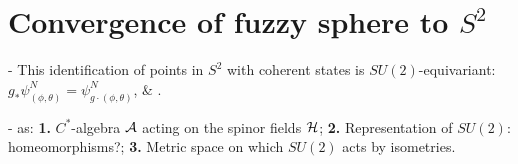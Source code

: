 \section{Convergence of fuzzy sphere to $S^2$}\label{FSsec:convergence}

 - This identification of points in $S^2$ with coherent states %
is $SU(2)$-equivariant: $g_* \psi^N_{(\phi, \theta)} = \psi^N_{g\cdot (\phi, \theta)}$, \& .
 
 - as: \textbf{1.} $C^*$-algebra $\mathcal A$ acting on the spinor fields $\mathcal H$; \textbf{2.} Representation of $SU(2)$: homeomorphisms?; \textbf{3.}  Metric space on which $SU(2)$ acts by isometries.
